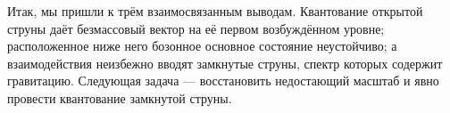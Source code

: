 \begin{classroomqa}
\end{classroomqa}

Итак, мы пришли к трём взаимосвязанным выводам. Квантование открытой струны даёт безмассовый вектор на её первом возбуждённом уровне; расположенное ниже него бозонное основное состояние неустойчиво; а взаимодействия неизбежно вводят замкнутые струны, спектр которых содержит гравитацию. Следующая задача — восстановить недостающий масштаб и явно провести квантование замкнутой струны.
